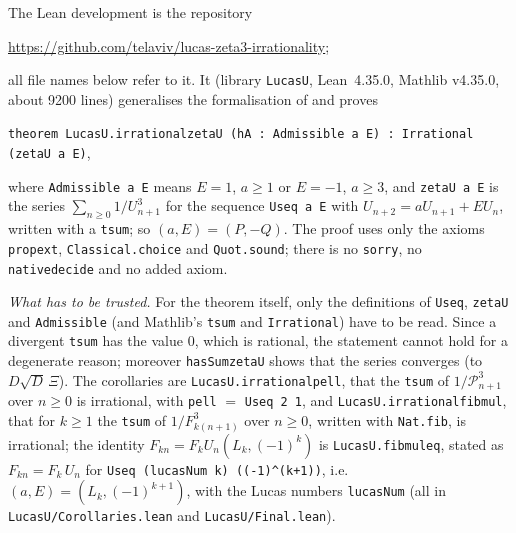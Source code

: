 \documentclass[11pt]{amsart}
\theoremstyle{definition}
\theoremstyle{remark}
\numberwithin{equation}{section}
\newcommand{\cP}{\mathcal{P}}
\newcommand{\lean}[1]{{\def\_{\textunderscore\allowbreak}\texttt{#1}}}
\begin{document}
The Lean development is the repository
\begin{center}
\url{https://github.com/telaviv/lucas-zeta3-irrationality};
\end{center}
all file names below refer to it. It (library \lean{LucasU}, Lean~4.35.0, Mathlib v4.35.0, about 9200 lines) generalises the formalisation of
\cite{Kri26} and proves
\begin{center}
\lean{theorem LucasU.irrational\_zetaU (hA : Admissible a E) : Irrational (zetaU a E)},
\end{center}
where \lean{Admissible a E} means $E=1$, $a\ge1$ or $E=-1$, $a\ge3$, and \lean{zetaU a E} is the series
$\sum_{n\ge0}1/U_{n+1}^3$ for the sequence \lean{Useq a E} with $U_{n+2}=aU_{n+1}+EU_n$, written with a \lean{tsum}; so
$(a,E)=(P,-Q)$. The proof uses only the axioms \lean{propext}, \lean{Classical.choice} and \lean{Quot.sound}; there is no
\lean{sorry}, no \lean{native\_decide} and no added axiom.

\emph{What has to be trusted.} For the theorem itself, only the definitions of \lean{Useq}, \lean{zetaU} and
\lean{Admissible} (and Mathlib's \lean{tsum} and \lean{Irrational}) have to be read. Since a divergent \lean{tsum} has
the value $0$, which is rational, the statement cannot hold for a degenerate reason; moreover \lean{hasSum\_zetaU}
shows that the series converges (to $D\sqrt D\,\Xi$). The corollaries are \lean{LucasU.irrational\_pell}, that the
\lean{tsum} of $1/\cP_{n+1}^3$ over $n\ge0$ is irrational, with \lean{pell} $=$ \lean{Useq 2 1}, and
\lean{LucasU.irrational\_fib\_mul}, that for $k\ge1$ the \lean{tsum} of $1/F_{k(n+1)}^3$ over $n\ge0$, written with
\lean{Nat.fib}, is irrational; the identity $F_{kn}=F_kU_n(L_k,(-1)^k)$ is \lean{LucasU.fib\_mul\_eq}, stated as
$F_{kn}=F_k\,U_n$ for \lean{Useq (lucasNum k) ((-1)\^{}(k+1))}, i.e.\ $(a,E)=(L_k,(-1)^{k+1})$, with the
Lucas numbers \lean{lucasNum} (all in \lean{LucasU/Corollaries.lean} and \lean{LucasU/Final.lean}).
\end{document}
